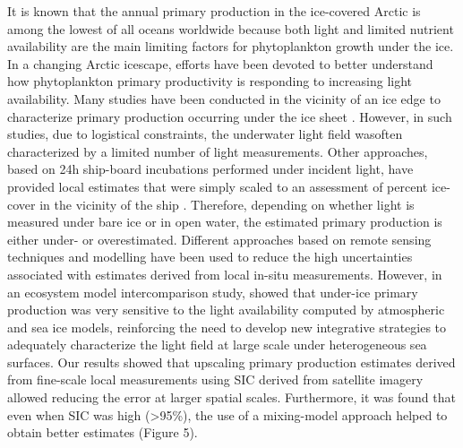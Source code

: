 It is known that the annual primary production in the ice-covered Arctic is among the lowest of all oceans worldwide because both light and limited nutrient availability are the main limiting factors for phytoplankton growth under the ice. In a changing Arctic icescape, efforts have been devoted to better understand how phytoplankton primary productivity is responding to increasing light availability. Many studies have been conducted in the vicinity of an ice edge to characterize primary production occurring under the ice sheet \citep{Arrigo2012, Arrigo2014, Mundy2009}. However, in such studies, due to logistical constraints, the underwater light field wasoften characterized by a limited number of light measurements. Other approaches, based on 24h ship-board incubations performed under incident light, have provided local estimates that were simply scaled to an assessment of percent ice-cover in the vicinity of the ship \citep{Smith1995, Gosselin1997, Mei2003}. Therefore, depending on whether light is measured under bare ice or in open water, the estimated primary production is either under- or overestimated. Different approaches based on remote sensing techniques and modelling have been used to reduce the high uncertainties associated with estimates derived from local in-situ measurements. However, in an ecosystem model intercomparison study, \citet{Jin2015} showed that under-ice primary production was very sensitive to the light availability computed by atmospheric and sea ice models, reinforcing the need to develop new integrative strategies to adequately characterize the light field at large scale under heterogeneous sea surfaces. Our results showed that upscaling primary production estimates derived from fine-scale local measurements using SIC derived from satellite imagery allowed reducing the error at larger spatial scales. Furthermore, it was found that even when SIC was high (\textgreater 95\%), the use of a mixing-model approach helped to obtain better estimates (Figure 5).
